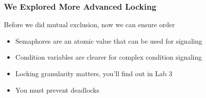   \begin{frame}
    \frametitle{We Explored More Advanced Locking}

    Before we did mutual exclusion, now we can ensure order

    \begin{itemize}
      \item Semaphores are an atomic value that can be used for signaling
      \item Condition variables are clearer for complex condition signaling
      \item Locking granularity matters, you'll find out in Lab 3
      \item You must prevent deadlocks
    \end{itemize}
  \end{frame}


